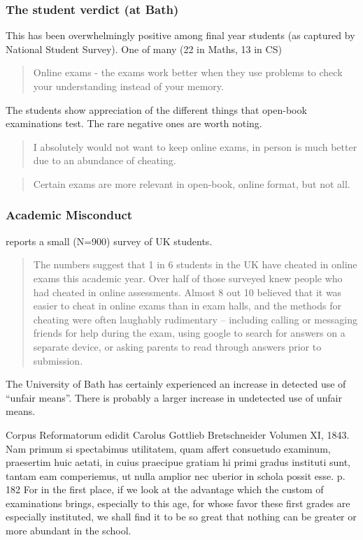 \begin{frame}[fragile]
\frametitle{The student verdict (at Bath)}
This has been overwhelmingly positive among final year students (as captured by National Student Survey). One of many (22 in Maths, 13 in CS)
\begin{quote}
Online exams - the exams work better when they use problems to check your understanding instead of your memory.
\end{quote}
\pause
The students show appreciation of the different things that open-book examinations test. \pause
The rare negative ones are worth noting.
\pause
\begin{quote}
I absolutely would not want to keep online exams, in person is much better due to an abundance of cheating.
\end{quote}
\pause
\begin{quote}
Certain exams are more relevant in open-book, online format, but not all.
\end{quote}
\end{frame}
\begin{frame}[fragile]
\frametitle{Academic Misconduct}
\cite{Dickinson2022a} reports a small (N=900) survey \cite{AcademicAppeals2022a}  of UK students. 
\pause
\begin{quote}
The numbers suggest that 1 in 6 students in the UK have cheated in online exams this academic year. Over half of those surveyed knew people who had cheated in online assessments. Almost 8 out 10 believed that it was easier to cheat in online exams than in exam halls, and the methods for cheating were often laughably rudimentary – including calling or messaging friends for help during the exam, using google to search for answers on a separate device, or asking parents to read through answers prior to submission.
\end{quote}
\pause
The University of Bath has certainly experienced an increase in detected use of ``unfair means''. There is probably a larger increase in undetected use of unfair means.
\pause\par
\end{frame}
\iffalse
Corpus Reformatorum edidit Carolus Gottlieb Bretschneider Volumen XI, 1843.
Nam primum si spectabimus utilitatem, quam affert consuetudo examinum, praesertim huic aetati, in cuius praecipue gratiam hi primi gradus instituti sunt, tantam eam comperiemus, ut nulla amplior nec uberior in schola possit esse. p. 182
For in the first place, if we look at the advantage which the custom of examinations brings, especially to this age, for whose favor these first grades are especially instituted, we shall find it to be so great that nothing can be greater or more abundant in the school.
